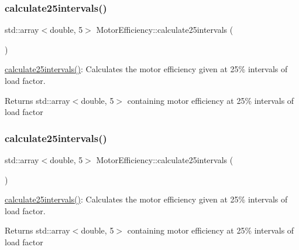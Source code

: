 \subsubsection{\texorpdfstring{calculate25intervals()}{calculate25intervals()}\hspace{0.1cm}{\footnotesize\ttfamily [2/3]}}
{\footnotesize\ttfamily std\+::array$<$double, 5$>$ Motor\+Efficiency\+::calculate25intervals (\begin{DoxyParamCaption}{ }\end{DoxyParamCaption})}

\hyperlink{class_motor_efficiency_a4135d26efe506365d9ecb7c15f43f35d}{calculate25intervals()}\+: Calculates the motor efficiency given at 25\% intervals of load factor. \begin{DoxyReturn}{Returns}
std\+::array$<$double, 5$>$ containing motor efficiency at 25\% intervals of load factor 
\end{DoxyReturn}
\mbox{\label{class_motor_efficiency_ac2bd043e7da0bea7e78b31528d1951a9}} 
\subsubsection{\texorpdfstring{calculate25intervals()}{calculate25intervals()}\hspace{0.1cm}{\footnotesize\ttfamily [3/3]}}
{\footnotesize\ttfamily std\+::array$<$double, 5$>$ Motor\+Efficiency\+::calculate25intervals (\begin{DoxyParamCaption}{ }\end{DoxyParamCaption})}

\hyperlink{class_motor_efficiency_a4135d26efe506365d9ecb7c15f43f35d}{calculate25intervals()}\+: Calculates the motor efficiency given at 25\% intervals of load factor. \begin{DoxyReturn}{Returns}
std\+::array$<$double, 5$>$ containing motor efficiency at 25\% intervals of load factor 
\end{DoxyReturn}
\mbox{\label{class_motor_efficiency_ae40031307b8631cf40df1c4069069dc0}} 

